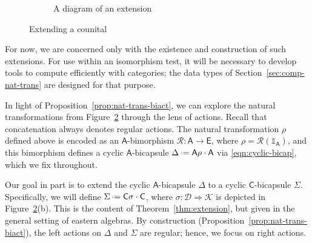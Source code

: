 \documentclass{amsart}
\newcommand{\Cat}[1]{\mathsf{#1}}
\newcommand{\cat}[1]{\Cat{#1}}
\numberwithin{lstfloat}{section}
\newcommand{\one}{\mathbb{1}}
\newcommand{\defeq}{\mathrel{\hstretch{.13}{=}\hspace{.2ex}{=}}}
\newcommand{\func}[1]{\mathcal{#1}}
\newcommand{\fD}{\func{D}}
\newcommand{\fI}{\func{I}}
\newcommand{\fJ}{\func{J}}
\newcommand{\fK}{\func{K}}
\newcommand{\fR}{\func{R}}
\newcommand{\cA}{\cat{A}}
\newcommand{\cC}{\cat{C}}
\newcommand{\cE}{\cat{E}}
\theoremstyle{definition}
\theoremstyle{remark}
\numberwithin{equation}{section}
\begin{document}
\begin{figure}[!htbp]
\begin{subfigure}[t]{0.49\textwidth}
      \caption{A diagram of an extension}
      \label{fig:ext-rho}
  \end{subfigure}
  \caption{Extending a counital}
  \label{fig:char-ext-2-cells}
\end{figure}

For now, we are concerned only with the existence and construction of such extensions. For use
within an isomorphism test, it will be necessary to develop tools to compute
efficiently with categories; the data types of Section~\ref{sec:comp-nat-trans}
are designed for that purpose.

In light of Proposition~\ref{prop:nat-trans-biact}, we can explore the natural
transformations from Figure~\ref{fig:char-ext-2-cells} through the lens of actions.
Recall that concatenation always denotes regular actions. The natural transformation
$\rho$ defined above is encoded as an $\cA$-bimorphism $\fR:\cA\to \cE$, where
$\rho=\fR(\one_{\cA})$, and this bimorphism defines a cyclic $\cA$-bicapsule
$\Delta\defeq \cA\rho \cdot \cA$ via \eqref{eqn:cyclic-bicap}, which we fix
throughout.

Our goal in part is to extend the cyclic $\cA$-bicapsule $\Delta$ to a cyclic
$\cC$-bicapsule $\Sigma$. Specifically, we will define $\Sigma\defeq\cC \sigma
\cdot \cC$, where $\sigma : \func{D} \Rightarrow \func{K}$ is depicted in
Figure~\ref{fig:char-ext-2-cells}(b).  This is the content of
Theorem~\ref{thm:extension}, but given in  the general setting of eastern algebras. By
construction (Proposition~\ref{prop:nat-trans-biact}), the left actions on
$\Delta$ and $\Sigma$ are regular; hence, we focus on right actions.
\end{document}
